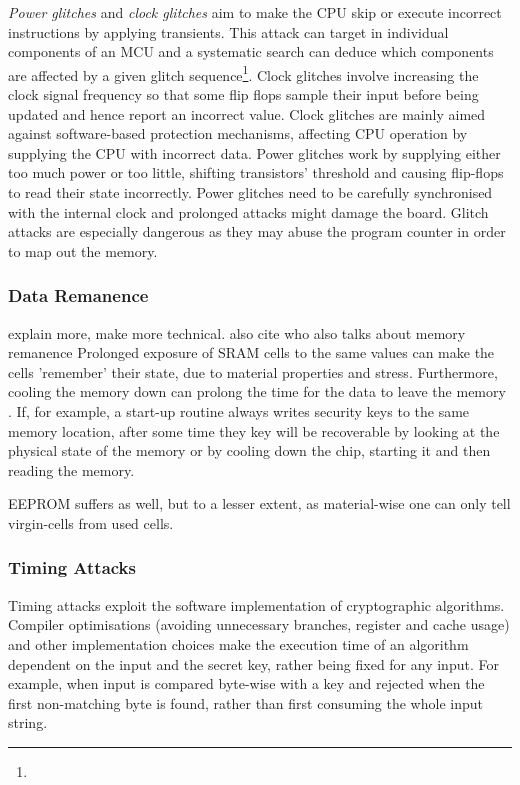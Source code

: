 		\emph{Power glitches} and \emph{clock glitches} aim to make the CPU skip or execute incorrect instructions by applying transients. This attack can target in individual components of an MCU and a systematic search can deduce which components are affected by a given glitch sequence\footnote{}. Clock glitches involve increasing the clock signal frequency so that some flip flops sample their input before being updated and hence report an incorrect value. Clock glitches are mainly aimed against software-based protection mechanisms, affecting CPU operation by supplying the CPU with incorrect data.	Power glitches work by supplying either too much power or too little, shifting transistors' threshold and causing flip-flops to read their state incorrectly. Power glitches need to be carefully synchronised with the internal clock and prolonged attacks might damage the board. Glitch attacks are especially dangerous as they may abuse the program counter in order to map out the memory\citep{glitches_paper}.
	\subsubsection{Data Remanence}
	{\color{red} explain more, make more technical. also cite \citep{website:ibm_secure} who also talks about memory remanence}
	Prolonged exposure of SRAM cells to the same values can make the cells 'remember' their state, due to material properties and stress\citep{gutman:memory_remanence}. Furthermore, cooling the memory down can prolong the time for the data to leave the memory \citep{gutman:memory_remanence}\citep{sergei:RAM}\citep{sergei:thesis}. If, for example, a start-up routine always writes security keys to the same memory location, after some time they key will be recoverable by looking at the physical state of the memory or by cooling down the chip, starting it and then reading the memory.
	
	EEPROM suffers as well, but to a lesser extent, as material-wise one can only tell virgin-cells from used cells\citep{sergei:thesis}. 
	
	\subsubsection{Timing Attacks}
	Timing attacks exploit the software implementation of cryptographic algorithms. Compiler optimisations (avoiding unnecessary branches, register and cache usage) and other implementation choices make the execution time of an algorithm dependent on the input and the secret key, rather being fixed for any input. For example, when input is compared byte-wise with a key and rejected when the first non-matching byte is found, rather than first consuming the whole input string.
	
